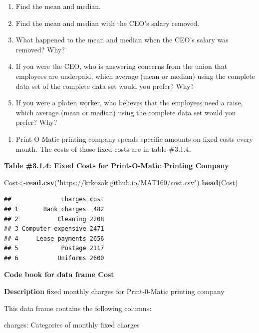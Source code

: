 \documentclass[
]{book}
\newenvironment{Shaded}{\begin{snugshade}}{\end{snugshade}}
\newcommand{\KeywordTok}[1]{\textcolor[rgb]{0.13,0.29,0.53}{\textbf{#1}}}
\newcommand{\NormalTok}[1]{#1}
\newcommand{\StringTok}[1]{\textcolor[rgb]{0.31,0.60,0.02}{#1}}
\providecommand{\tightlist}{%
  \setlength{\itemsep}{0pt}\setlength{\parskip}{0pt}}
\begin{document}
\begin{enumerate}
\def\labelenumi{\alph{enumi}.}
\item
  Find the mean and median.
\item
  Find the mean and median with the CEO's salary removed.
\item
  What happened to the mean and median when the CEO's salary was removed? Why?
\item
  If you were the CEO, who is answering concerns from the union that employees are underpaid, which average (mean or median) using the complete data set of the complete data set would you prefer? Why?
\item
  If you were a platen worker, who believes that the employees need a raise, which average (mean or median) using the complete data set would you prefer? Why?
\end{enumerate}

\begin{enumerate}
\def\labelenumi{\arabic{enumi}.}
\setcounter{enumi}{3}
\tightlist
\item
  Print-O-Matic printing company spends specific amounts on fixed costs every month. The costs of those fixed costs are in table \#3.1.4.
\end{enumerate}

\textbf{Table \#3.1.4: Fixed Costs for Print-O-Matic Printing Company}

\begin{Shaded}
\begin{Highlighting}[]
\NormalTok{Cost<-}\KeywordTok{read.csv}\NormalTok{(}\StringTok{"https://krkozak.github.io/MAT160/cost.csv"}\NormalTok{)}
\KeywordTok{head}\NormalTok{(Cost)}
\end{Highlighting}
\end{Shaded}

\begin{verbatim}
##              charges cost
## 1       Bank charges  482
## 2           Cleaning 2208
## 3 Computer expensive 2471
## 4     Lease payments 2656
## 5            Postage 2117
## 6           Uniforms 2600
\end{verbatim}

\textbf{Code book for data frame Cost}

\textbf{Description}
fixed monthly charges for Print-0-Matic printing company

This data frame contains the following columns:

charges: Categories of monthly fixed charges
\end{document}
